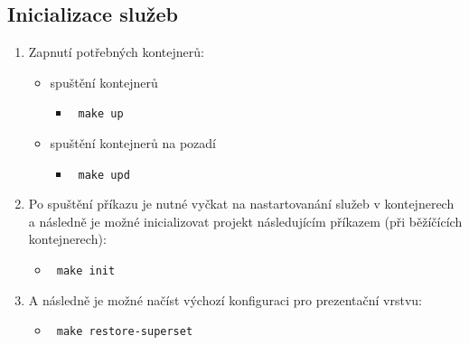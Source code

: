 \documentclass[10pt,a4paper,titlepage]{extarticle}
\begin{document}
    \subsection{Inicializace služeb}\label{initialization-of-services}

    \begin{enumerate}
        \def\labelenumi{\arabic{enumi}.}
        \itemsep1pt\parskip0pt
        \item Zapnutí potřebných kontejnerů:

        \begin{itemize}
            \itemsep1pt\parskip0pt

            \item spuštění kontejnerů

            \begin{itemize}
                \itemsep1pt\parskip0pt
                \item[] \texttt{\textdollar\ make up}
            \end{itemize}

            \item spuštění kontejnerů na pozadí

            \begin{itemize}
                \itemsep1pt\parskip0pt
                \item[] \texttt{\textdollar\ make upd}
            \end{itemize}
        \end{itemize}

        \item Po spuštění příkazu je nutné vyčkat na nastartovanání služeb v kontejnerech a následně je možné
        inicializovat projekt následujícím příkazem (při běžíčících kontejnerech):

        \begin{itemize}
            \itemsep1pt\parskip0pt
            \item[] \texttt{\textdollar\ make init}
        \end{itemize}

        \item A následně je možné načíst výchozí konfiguraci pro prezentační vrstvu:

        \begin{itemize}
            \itemsep1pt\parskip0pt
            \item[] \texttt{\textdollar\ make restore-superset}
        \end{itemize}
    \end{enumerate}
\end{document}
